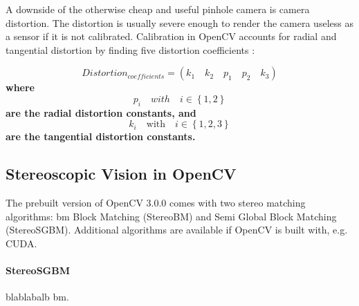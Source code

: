 A downside of the otherwise cheap and useful pinhole camera is camera distortion. The distortion is usually severe enough to render the camera useless as a sensor if it is not calibrated. Calibration in OpenCV accounts for radial and tangential distortion by finding five distortion coefficients \cite{3dCalib}:

\begin{equation*}
	 Distortion_{coefficients} = (k_1 \quad k_2 \quad p_1 \quad p_2 \quad k_3)
\end{equation*}
\textbf{where} 
\begin{equation*}
 	p_i \quad with \quad i \in \left\{1, 2\right\}
\end{equation*}
\textbf{are the radial distortion constants, and}
\begin{equation*}
	k_i \quad \textrm{with} \quad i \in \left\{1, 2, 3\right\}  
\end{equation*}
\textbf{are the tangential distortion constants.} 

\subsection{Stereoscopic Vision in OpenCV}

The prebuilt version of OpenCV 3.0.0 comes with two stereo matching algorithms: \gls{bm} Block Matching (StereoBM) and Semi Global Block Matching (StereoSGBM). Additional algorithms are available if OpenCV is built with, e.g. CUDA.

\paragraph{StereoSGBM}\cite{hirschmullerstereo}
blablabalb \gls{bm}.
